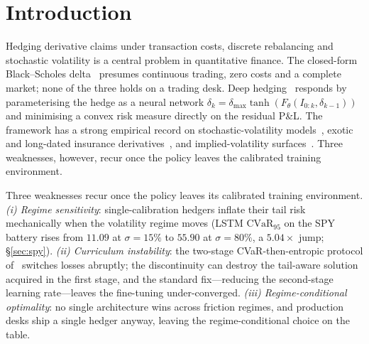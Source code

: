 \documentclass[10pt,letterpaper]{article}
\newcommand{\cvar}{\mathrm{CVaR}}
\begin{document}
\section{Introduction}\label{sec:intro}

Hedging derivative claims under transaction costs, discrete
rebalancing and stochastic volatility is a central problem in
quantitative finance. The closed-form Black--Scholes
delta~\citep{black1973pricing} presumes continuous trading, zero
costs and a complete market; none of the three holds on a trading
desk. Deep hedging~\citep{buehler2019deep} responds by parameterising
the hedge as a neural network
$\delta_k = \delta_{\max}\tanh(F_\theta(I_{0:k},\delta_{k-1}))$ and
minimising a convex risk measure directly on the residual P\&L. The
framework has a strong empirical record on
stochastic-volatility models~\citep{horvath2021deep}, exotic and
long-dated insurance derivatives~\citep{carbonneau2021deep}, and
implied-volatility surfaces~\citep{imaki2021deep}. Three weaknesses,
however, recur once the policy leaves the calibrated training
environment.

Three weaknesses recur once the policy leaves its calibrated
training environment.
\emph{(i) Regime sensitivity}: single-calibration hedgers inflate
their tail risk mechanically when the volatility regime moves
(LSTM $\cvar_{95}$ on the SPY battery rises from $11.09$ at
$\sigma=15\%$ to $55.90$ at $\sigma=80\%$, a $5.04\times$ jump;
\S\ref{sec:spy}).
\emph{(ii) Curriculum instability}: the two-stage CVaR-then-entropic
protocol of~\citet{kozyra2019deep} switches losses abruptly; the
discontinuity can destroy the tail-aware solution acquired in the
first stage, and the standard fix---reducing the second-stage
learning rate---leaves the fine-tuning under-converged.
\emph{(iii) Regime-conditional optimality}: no single architecture
wins across friction regimes, and production desks ship a single
hedger anyway, leaving the regime-conditional choice on the table.
\end{document}
